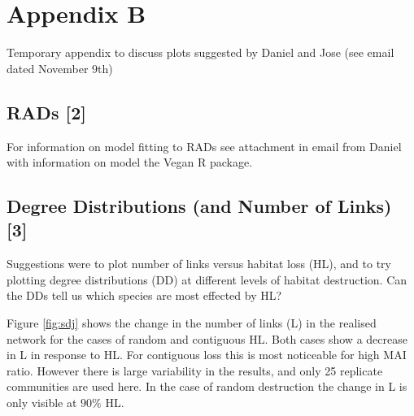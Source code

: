 
\chapter{Appendix B}
\label{app:app0b}

Temporary appendix to discuss plots suggested by Daniel and Jose (see email dated November 9th)


\section{RADs [2]}
\label{sec:rads}

For information on model fitting to RADs see attachment in email from Daniel with information on model the Vegan R package.

\section{Degree Distributions (and Number of Links) [3]}
\label{sec:dd}

Suggestions were to plot number of links versus habitat loss (HL), and to try plotting degree distributions (DD) at different levels of habitat destruction. Can the DDs tell us which species are most effected by HL?

Figure \ref{fig:sdj} shows the change in the number of links (L) in the realised network for the cases of random and contiguous HL. Both cases show a decrease in L in response to HL. For contiguous loss this is most noticeable for high MAI ratio. However there is large variability in the results, and only 25 replicate communities are used here. In the case of random destruction the change in L is only visible at $90\%$ HL.  


